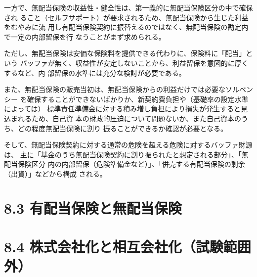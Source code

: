 \documentclass[report,gutter=10mm,fore-edge=10mm,uplatex,dvipdfmx]{jlreq}
\begin{document}
一方で、無配当保険の収益性・健全性は、第一義的に無配当保険区分の中で確保され
ること（セルフサポート）が要求されるため、無配当保険から生じた利益をむやみに流
用し有配当保険契約に振替えるのではなく、無配当保険の勘定内で一定の内部留保を行
なうことがまず求められる。

ただし、無配当保険は安価な保険料を提供できる代わりに、保険料に「配当」という
バッファが無く、収益性が安定しないことから、利益留保を意図的に厚くするなど、内
部留保の水準には充分な検討が必要である。

また、無配当保険の販売当初は、無配当保険からの利益だけでは必要なソルベンシー
を確保することができないばかりか、新契約費負担や（基礎率の設定水準によっては）
標準責任準備金に対する積み増し負担により損失が発生すると見込まれるため、自己資
本の財政的圧迫について問題ないか、また自己資本のうち、どの程度無配当保険に割り
振ることができるか確認が必要となる。

そして、無配当保険契約に対する通常の危険を超える危険に対するバッファ財源は、
主に「基金のうち無配当保険契約に割り振られたと想定される部分」、「無配当保険区分
内の内部留保（危険準備金など）」、「併売する有配当保険の剰余（出資）」などから構成
される。

\section{8.3 有配当保険と無配当保険}
\section{8.4 株式会社化と相互会社化（試験範囲外）}
\end{document}
